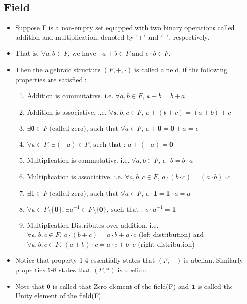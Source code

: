 \documentclass[twoside]{article}
\begin{document}
\subsection{Field}
\begin{itemize}
	\item Suppose F is a non-empty set equipped with two binary operations called addition and multiplication, denoted by '+' and $'\cdot'$, respectively. 
	\item That is, $\forall a,b \in F \text{, we have : } a + b \in F \text{ and } a \cdot b \in F $.
	\item Then the algebraic structure $(F, +, \cdot)$ is called a field, if the following properties are satisfied : 
		\begin{enumerate}
			\item Addition is commutative. i.e. $\forall a,b \in F \text{, } a + b = b + a$
			\item Addition is associative. i.e. $\forall a,b,c \in F \text{, } a + (b + c) = (a + b) + c$
			\item $\exists \mathbf{0}\in F \text{ (called zero), such that } \forall a \in F \text{, } a + \mathbf{0} = \mathbf{0} + a = a$
			\item $\forall a \in F \text{, } \exists (-a) \in F \text{, such that : } a + (-a) = \mathbf{0}$
			\item Multiplication is commutative. i.e. $\forall a,b \in F \text{, } a \cdot b = b \cdot a$
			\item Multiplication is associative. i.e. $\forall a,b,c \in F \text{, } a \cdot (b \cdot  c) = (a \cdot b) \cdot c$
			\item $\exists \mathbf{1}\in F \text{ (called zero), such that } \forall a \in F \text{, } a \cdot \mathbf{1} = \mathbf{1} \cdot a = a$
			\item $\forall a \in F \setminus\{ \mathbf{0} \} \text{, } \exists a^{-1} \in F \setminus \{\mathbf{0}\} \text{, such that : } a \cdot a^{-1} = \mathbf{1}$
			\item Multiplication Distributes over addition, i.e. $\forall a,b,c \in F \text{, } a \cdot (b + c) = a \cdot b + a \cdot c $ (left distribution) and $\forall a,b,c \in F \text{, } (a + b) \cdot c = a \cdot c + b \cdot c$ (right distribution)
		\end{enumerate}
	\item Notice that property 1-4 essentially states that $(F,+)$ is abelian. Similarly properties 5-8 states that $(F,*)$ is abelian.
	\item Note that $\mathbf{0}$ is called that Zero element of the field(F) and $\mathbf{1}$ is called the Unity element of the field(F).

\end{itemize}
\end{document}
